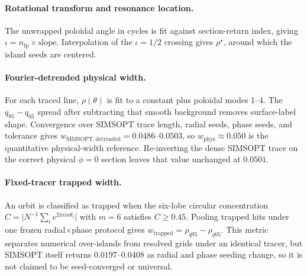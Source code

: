 \documentclass[11pt,a4paper]{article}
\begin{document}
\paragraph{Rotational transform and resonance location.}
The unwrapped poloidal angle in cycles is fit against section-return index,
giving \(\iota=n_{\mathrm{fp}}\times\mathrm{slope}\).  Interpolation of the
\(\iota=1/2\) crossing gives \(\rho^\star\), around which the island seeds are
centered.

\paragraph{Fourier-detrended physical width.}
For each traced line, \(\rho(\theta)\) is fit to a constant plus poloidal
modes 1--4.  The \(q_{95}-q_{05}\) spread after subtracting that smooth
background removes surface-label shape.  Convergence over SIMSOPT trace
length, radial seeds, phase seeds, and tolerance gives
\(w_{\mathrm{SIMSOPT,detrended}}=0.0486\)--\(0.0503\), so
\(w_{\mathrm{phys}}\approx0.050\) is the quantitative physical-width
reference.  Re-inverting the dense SIMSOPT trace on the correct physical
\(\phi=0\) section leaves that value unchanged at \(0.0501\).

\paragraph{Fixed-tracer trapped width.}
An orbit is classified as trapped when the six-lobe circular concentration
\(C=\lvert N^{-1}\sum_i e^{2\pi i m\theta_i}\rvert\) with \(m=6\) satisfies
\(C\ge0.45\).  Pooling trapped hits under one frozen radial\(\times\)phase
protocol gives \(w_{\mathrm{trapped}}=\rho_{q95}-\rho_{q05}\).  This metric
separates numerical over-islands from resolved grids under an identical
tracer, but SIMSOPT itself returns \(0.0197\)--\(0.0408\) as radial and phase
seeding change, so it is not claimed to be seed-converged or universal.
\end{document}
